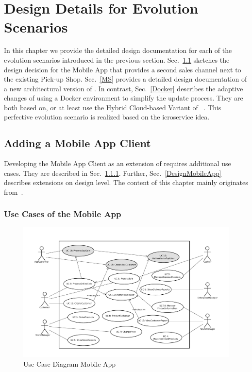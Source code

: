 
\chapter{Design Details for Evolution Scenarios}
\label{c:design}
In this chapter we provide the detailed design documentation for each of the evolution scenarios introduced in the previous section. 
Sec.~\ref{App} sketches the design decision for the Mobile App that provides a second sales channel next to the existing Pick-up Shop. Sec.~\ref{MS} provides a detailed design documentation of a new architectural version of \CoCoME. In contrast, Sec.~\ref{Docker} describes the adaptive changes of using a Docker environment to simplify the update process. They are both based on, or at least use the Hybrid Cloud-based Variant of \CoCoME~\cite{HeinrichRostamiReussner2016_1000052688}. This perfective evolution scenario is realized based on the icroservice idea.

\section{Adding a Mobile App Client} 
\label{App}
Developing the Mobile App Client as an extension of \CoCoME requires additional use cases. They are described in Sec.~\ref{UseCasesMobileApp}. Further, Sec.~\ref{DesignMobileApp} describes extensions on design level. The content of this chapter mainly originates from~\cite{schnabel}.

\subsection{Use Cases of the Mobile App}
\label{UseCasesMobileApp}
\begin{figure}[t]
	\includegraphics[width=\textwidth]{img/appUseCase.pdf}
	\caption{Use Case Diagram \CoCoME Mobile App}
\end{figure}

